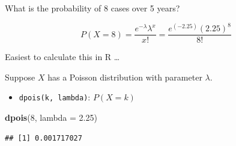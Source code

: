 \documentclass[ignorenonframetext,aspectratio=169]{beamer}
\newenvironment{Shaded}{\begin{snugshade}}{\end{snugshade}}
\newcommand{\KeywordTok}[1]{\textcolor[rgb]{0.13,0.29,0.53}{\textbf{#1}}}
\newcommand{\DataTypeTok}[1]{\textcolor[rgb]{0.13,0.29,0.53}{#1}}
\newcommand{\DecValTok}[1]{\textcolor[rgb]{0.00,0.00,0.81}{#1}}
\newcommand{\FloatTok}[1]{\textcolor[rgb]{0.00,0.00,0.81}{#1}}
\newcommand{\NormalTok}[1]{#1}
\providecommand{\tightlist}{%
  \setlength{\itemsep}{0pt}\setlength{\parskip}{0pt}}
\begin{document}
\begin{frame}[fragile]{What is the probability of 8 cases over 5 years?}

\[P(X=8) = \frac{e^{-\lambda}\lambda^{x}}{x!} =  \frac{e^{(-2.25)}(2.25)^{8}}{8!}\]

Easiest to calculate this in \textsf{R} \ldots{}

Suppose \(X\) has a Poisson distribution with parameter \(\lambda\).

\begin{itemize}
\tightlist
\item
  \texttt{dpois(k, lambda)}: \(P(X = k)\)
\end{itemize}

\begin{Shaded}
\begin{Highlighting}[]
\KeywordTok{dpois}\NormalTok{(}\DecValTok{8}\NormalTok{, }\DataTypeTok{lambda =} \FloatTok{2.25}\NormalTok{)}
\end{Highlighting}
\end{Shaded}

\begin{verbatim}
## [1] 0.001717027
\end{verbatim}

\end{frame}
\end{document}
